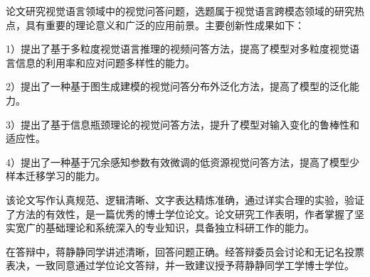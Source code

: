 




论文研究视觉语言领域中的视觉问答问题，选题属于视觉语言跨模态领域的研究热点，具有重要的理论意义和广泛的应用前景。主要创新性成果如下：

1）提出了基于多粒度视觉语言推理的视频问答方法，提高了模型对多粒度视觉语言信息的利用率和应对问题多样性的能力。

2）提出了一种基于图生成建模的视觉问答分布外泛化方法，提高了模型的泛化能力。

3）提出了基于信息瓶颈理论的视觉问答方法，提升了模型对输入变化的鲁棒性和适应性。

4）提出了一种基于冗余感知参数有效微调的低资源视觉问答方法，提高了模型少样本迁移学习的能力。

该论文写作认真规范、逻辑清晰、文字表达精炼准确，通过详实合理的实验，验证了方法的有效性，是一篇优秀的博士学位论文。论文研究工作表明，作者掌握了坚实宽广的基础理论和系统深入的专业知识，具备独立科研工作的能力。

在答辩中，蒋静静同学讲述清晰，回答问题正确。经答辩委员会讨论和无记名投票表决，一致同意通过学位论文答辩，并一致建议授予蒋静静同学工学博士学位。
